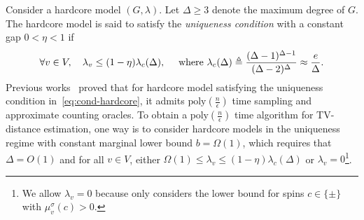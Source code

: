 Consider a hardcore model  $(G,\lambda)$. Let $\Delta \geq 3$ denote the maximum degree of $G$. The hardcore model is said to satisfy the \emph{uniqueness condition} with a constant gap $0 < \eta < 1$ if
\begin{align}\label{eq:cond-hardcore}
    \forall v \in V, \quad \lambda_v \leq (1-\eta)\lambda_c(\Delta), \quad \text{ where } \lambda_c(\Delta) \triangleq \frac{(\Delta-1)^{\Delta - 1}}{(\Delta-2)^\Delta} \approx \frac{e}{\Delta}.
\end{align}
Previous works~\cite{CFYZ22,CE22,SVV09} proved that for hardcore model satisfying the uniqueness condition in~\eqref{eq:cond-hardcore}, it admits $\text{poly}(\frac{n}{\epsilon})$ time sampling and approximate counting oracles. %
To obtain a $\text{poly}(\frac{n}{\epsilon})$ time algorithm for TV-distance estimation, one way is to consider hardcore models in the uniqueness regime with constant marginal lower bound $b =\Omega(1)$, which requires that $\Delta = O(1)$ and for all $v \in V$, either $\Omega(1) \leq \lambda_v \leq (1-\eta)\lambda_c(\Delta)$ or $\lambda_v = 0$\footnote{We allow $\lambda_v = 0$ because  only considers the lower bound for spins $c \in \{\pm\}$ with $\mu^\sigma_v(c) > 0$.}.


